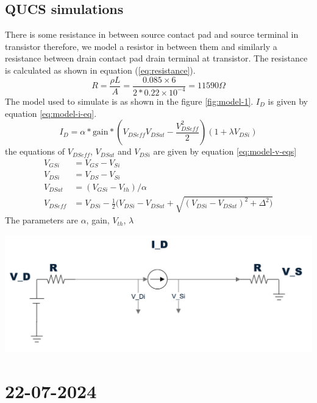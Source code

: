 \documentclass{article}
\begin{document}
\subsection*{QUCS simulations}
There is some resistance in between source contact pad and source terminal in transistor therefore, we model a resistor in between them and similarly a resistance between drain contact pad drain terminal at transistor. The resistance is calculated as shown in equation (\ref{eq:resistance}). 
\begin{equation}
    \label{eq:resistance}
                 R = \frac{\rho L}{A} = \frac{0.085 \times 6}{2*0.22 \times10^{-4}} = 11590 \Omega
\end{equation}
The model used to simulate is as shown in the figure \ref{fig:model-1}. $I_D$ is given by equation \ref{eq:model-i-eq}. 
\begin{equation}
    \label{eq:model-i-eq}
    \boxed{I_{D} = \alpha*\text{gain}*(V_{DSeff}V_{DSat}-\frac{V_{DSeff}^2}{2})(1+\lambda V_{DSi})}
\end{equation}
the equations of $V_{DSeff}$, $V_{DSat}$ and $V_{DSi}$ are given by equation \ref{eq:model-v-eqs}
\begin{align}
    \label{eq:model-v-eqs}
    V_{GSi}   &= V_{GS} - V_{Si} \\
    V_{DSi}   &= V_{DS} - V_{Si} \\
    V_{DSat}  &= (V_{GSi} - V_{th})/\alpha \\
    V_{DSeff} &= V_{DSi} - \frac{1}{2}(V_{DSi}-V_{DSat}+\sqrt{(V_{DSi}-V_{DSat})^2+\Delta^2)}
\end{align}
The parameters are $\alpha$, gain, $V_{th}$, $\lambda$
\begin{center}
    \label{fig:model-1}
    \includegraphics[scale=0.4]{../Images/Previous/model-1.png}
\end{center}
\newpage
\section{22-07-2024}
\end{document}
